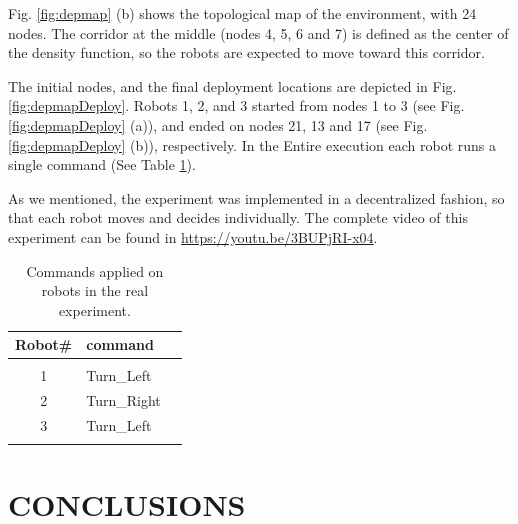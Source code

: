 \documentclass[smallcondensed]{svjour3}
\begin{document}
Fig. \ref{fig:depmap} (b) shows the topological map of the environment, with 24 nodes. The corridor at the middle (nodes 4, 5, 6 and 7) is defined as the center of the density function, so the robots are expected to move toward this corridor.

The initial nodes, and the final deployment locations are depicted in Fig. \ref{fig:depmapDeploy}. Robots 1, 2, and 3 started from nodes 1 to 3 (see Fig. \ref{fig:depmapDeploy} (a)), and ended on nodes 21, 13 and 17 (see Fig. \ref{fig:depmapDeploy} (b)), respectively. In the Entire execution each robot runs a single command (See Table \ref{tbl:commands}).

As we mentioned, the experiment was implemented in a decentralized fashion, so that each robot moves and decides individually. The complete video of this experiment can be found in \href{https://youtu.be/3BUPjRI-x04}{https://youtu.be/3BUPjRI-x04}.

\begin{table}[H]
\centering
\caption{Commands applied on robots in the real experiment. }
\label{tbl:commands}
\begin{tabular}{cm{2cm}m{1.2cm}}
Robot\#    & command    \\
\hline\\
1   & Turn\_Left   \\
2 &  Turn\_Right \\
3 & Turn\_Left \\
\hline\\
\end{tabular}
\end{table}

\section{CONCLUSIONS}
\label{sec:conclusion}
\end{document}
